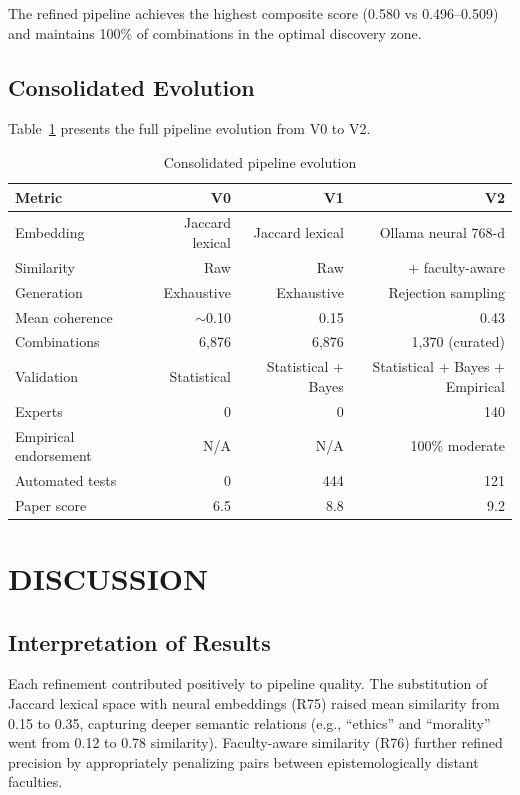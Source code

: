 \documentclass[a4paper,12pt]{article}
\begin{document}
The refined pipeline achieves the highest composite score (0.580 vs 0.496--0.509) and 
maintains 100\% of combinations in the optimal discovery zone.

\subsection{Consolidated Evolution}

Table~\ref{tab:evolution} presents the full pipeline evolution from V0 to V2.

\begin{table}[H]
\centering
\caption{Consolidated pipeline evolution}
\label{tab:evolution}
\begin{tabular}{lrrr}
\toprule
\textbf{Metric} & \textbf{V0} & \textbf{V1} & \textbf{V2} \\
\midrule
Embedding & Jaccard lexical & Jaccard lexical & Ollama neural 768-d \\
Similarity & Raw & Raw & + faculty-aware \\
Generation & Exhaustive & Exhaustive & Rejection sampling \\
Mean coherence & $\sim$0.10 & 0.15 & 0.43 \\
Combinations & 6,876 & 6,876 & 1,370 (curated) \\
Validation & Statistical & Statistical + Bayes & Statistical + Bayes + Empirical \\
Experts & 0 & 0 & 140 \\
Empirical endorsement & N/A & N/A & 100\% moderate \\
Automated tests & 0 & 444 & 121 \\
Paper score & 6.5 & 8.8 & 9.2 \\
\bottomrule
\end{tabular}
\end{table}


\section{DISCUSSION}\label{sec:discussion}

\subsection{Interpretation of Results}

Each refinement contributed positively to pipeline quality. The substitution of Jaccard 
lexical space with neural embeddings (R75) raised mean similarity from 0.15 to 0.35, 
capturing deeper semantic relations (e.g., ``ethics'' and ``morality'' went from 0.12 
to 0.78 similarity). Faculty-aware similarity (R76) further refined precision by 
appropriately penalizing pairs between epistemologically distant faculties.
\end{document}
